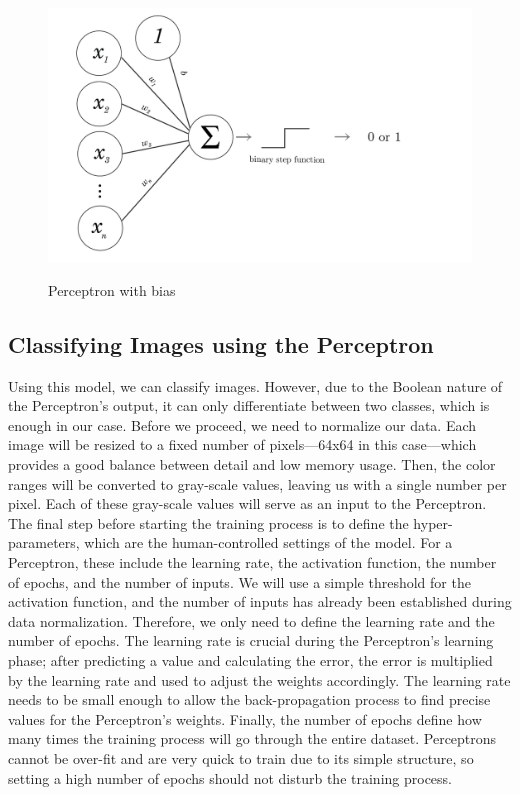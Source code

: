 \documentclass{article}
\begin{document}
\begin{figure}[ht]
    \caption*{Perceptron with bias}
    \centering
    \includegraphics[width=0.75\linewidth]{assets/perceptron/perceptron-bias.png}
    \label{fig:perceptron-bias}
\end{figure}

\newpage

\subsection{Classifying Images using the Perceptron}

Using this model, we can classify images. However, due to the Boolean nature of the Perceptron's output, it can only differentiate between two classes, which is enough in our case. Before we proceed, we need to normalize our data. Each image will be resized to a fixed number of pixels—64x64 in this case—which provides a good balance between detail and low memory usage. Then, the color ranges will be converted to gray-scale values, leaving us with a single number per pixel. Each of these gray-scale values will serve as an input to the Perceptron. The final step before starting the training process is to define the hyper-parameters, which are the human-controlled settings of the model. For a Perceptron, these include the learning rate, the activation function, the number of epochs, and the number of inputs. We will use a simple threshold for the activation function, and the number of inputs has already been established during data normalization. Therefore, we only need to define the learning rate and the number of epochs. The learning rate is crucial during the Perceptron's learning phase; after predicting a value and calculating the error, the error is multiplied by the learning rate and used to adjust the weights accordingly. The learning rate needs to be small enough to allow the back-propagation process to find precise values for the Perceptron's weights. Finally, the number of epochs define how many times the training process will go through the entire dataset. Perceptrons cannot be over-fit and are very quick to train due to its simple structure, so setting a high number of epochs should not disturb the training process.
\end{document}
